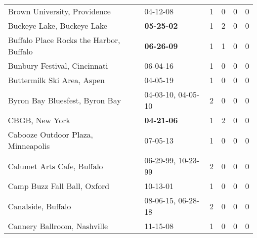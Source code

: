 \begin{longtable}{p{}p{}p{}p{}p{}p{}}
                                                 Brown University, Providence &                                                04-12-08\textsuperscript{} &  1 &  0 &  0 &  0 \\
                                                   Buckeye Lake, Buckeye Lake &                                       \textbf{05-25-02\textsuperscript{}} &  1 &  2 &  0 &  0 \\
                                      Buffalo Place Rocks the Harbor, Buffalo &                                       \textbf{06-26-09\textsuperscript{}} &  1 &  1 &  0 &  0 \\
                                                 Bunbury Festival, Cincinnati &                                                06-04-16\textsuperscript{} &  1 &  0 &  0 &  0 \\
                                                   Buttermilk Ski Area, Aspen &                                                04-05-19\textsuperscript{} &  1 &  0 &  0 &  0 \\
                                               Byron Bay Bluesfest, Byron Bay &                    04-03-10\textsuperscript{}, 04-05-10\textsuperscript{} &  2 &  0 &  0 &  0 \\
                                                               CBGB, New York &                                       \textbf{04-21-06\textsuperscript{}} &  1 &  2 &  0 &  0 \\
                                           Cabooze Outdoor Plaza, Minneapolis &                                                07-05-13\textsuperscript{} &  1 &  0 &  0 &  0 \\
                                                   Calumet Arts Cafe, Buffalo &                    06-29-99\textsuperscript{}, 10-23-99\textsuperscript{} &  2 &  0 &  0 &  0 \\
                                                  Camp Buzz Fall Ball, Oxford &                                                10-13-01\textsuperscript{} &  1 &  0 &  0 &  0 \\
                                                           Canalside, Buffalo &                    08-06-15\textsuperscript{}, 06-28-18\textsuperscript{} &  2 &  0 &  0 &  0 \\
                                                  Cannery Ballroom, Nashville &                                                11-15-08\textsuperscript{} &  1 &  0 &  0 &  0 \\

\end{longtable}
